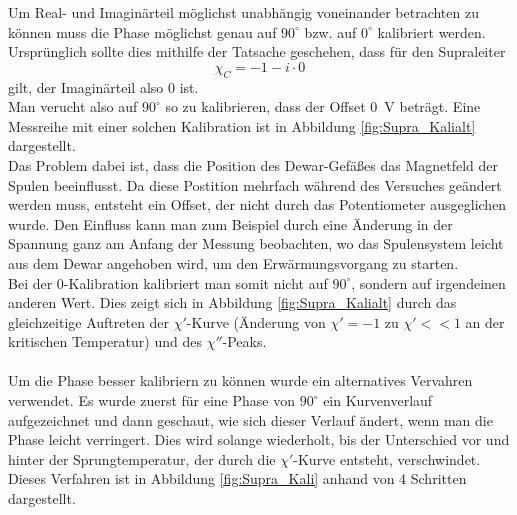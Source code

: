 \documentclass[12pt,a4paper]{article}
\begin{document}
Um Real- und Imaginärteil möglichst unabhängig voneinander betrachten zu können muss die Phase möglichst genau auf $90^\circ$ bzw. auf $0^\circ$ kalibriert werden. Ursprünglich sollte dies mithilfe der Tatsache geschehen, dass für den Supraleiter
\begin{equation}
\chi_C = -1-i\cdot 0
\end{equation}
gilt, der Imaginärteil also 0 ist.\\
Man verucht also auf $90^\circ$ so zu kalibrieren, dass der Offset \SI{0}{V} beträgt. Eine Messreihe mit einer solchen Kalibration ist in Abbildung \ref{fig:Supra_Kalialt} dargestellt.\\
Das Problem dabei ist, dass die Position des Dewar-Gefäßes das Magnetfeld der Spulen beeinflusst. Da diese Postition mehrfach während des Versuches geändert werden muss, entsteht ein Offset, der nicht durch das Potentiometer ausgeglichen wurde. Den Einfluss kann man zum Beispiel durch eine Änderung in der Spannung ganz am Anfang der Messung beobachten, wo das Spulensystem leicht aus dem Dewar angehoben wird, um den Erwärmungsvorgang zu starten.\\
Bei der 0-Kalibration kalibriert man somit nicht auf $90^\circ$, sondern auf irgendeinen anderen Wert. Dies zeigt sich in Abbildung \ref{fig:Supra_Kalialt} durch das gleichzeitige Auftreten der $\chi'$-Kurve (Änderung von $\chi' = -1$ zu $\chi' << 1$ an der kritischen Temperatur) und des $\chi''$-Peaks.\\
\\
Um die Phase besser kalibriern zu können wurde ein alternatives Vervahren verwendet. Es wurde zuerst für eine Phase von $90^\circ$ ein Kurvenverlauf aufgezeichnet und dann geschaut, wie sich dieser Verlauf ändert, wenn man die Phase leicht verringert. Dies wird solange wiederholt, bis der Unterschied vor und hinter der Sprungtemperatur, der durch die $\chi'$-Kurve entsteht, verschwindet. Dieses Verfahren ist in Abbildung \ref{fig:Supra_Kali} anhand von 4 Schritten dargestellt.
\end{document}
